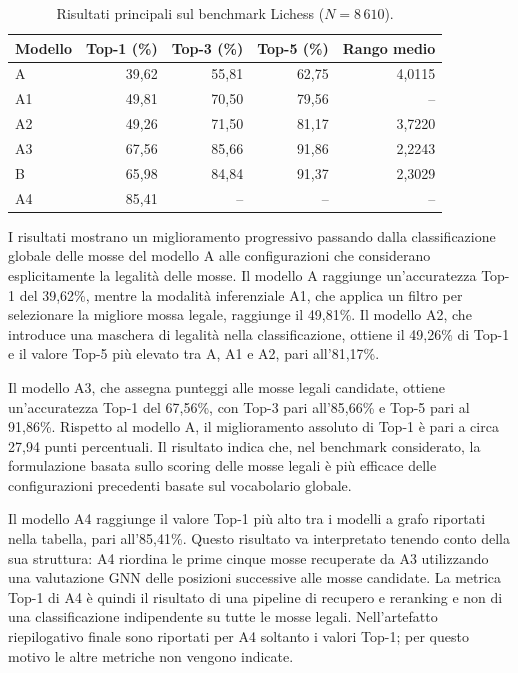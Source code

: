 \begin{table}[htbp]
    \centering
    \small
    \caption{Risultati principali sul benchmark Lichess (\(N=8\,610\)).}
    \label{tab:lichess-main-results}
    \begin{tabular}{lrrrr}
        \toprule
        Modello & Top-1 (\%) & Top-3 (\%) & Top-5 (\%) & Rango medio \\
        \midrule
        A   & 39,62 & 55,81 & 62,75 & 4,0115 \\
        A1  & 49,81 & 70,50 & 79,56 & -- \\
        A2  & 49,26 & 71,50 & 81,17 & 3,7220 \\
        A3  & 67,56 & 85,66 & 91,86 & 2,2243 \\
        B   & 65,98 & 84,84 & 91,37 & 2,3029 \\
        A4  & 85,41 & -- & -- & -- \\
        \bottomrule
    \end{tabular}
\end{table}

I risultati mostrano un miglioramento progressivo passando dalla classificazione globale delle mosse del modello A alle configurazioni che considerano esplicitamente la legalità delle mosse. Il modello A raggiunge un'accuratezza Top-1 del 39,62\%, mentre la modalità inferenziale A1, che applica un filtro per selezionare la migliore mossa legale, raggiunge il 49,81\%. Il modello A2, che introduce una maschera di legalità nella classificazione, ottiene il 49,26\% di Top-1 e il valore Top-5 più elevato tra A, A1 e A2, pari all'81,17\%.

Il modello A3, che assegna punteggi alle mosse legali candidate, ottiene un'accuratezza Top-1 del 67,56\%, con Top-3 pari all'85,66\% e Top-5 pari al 91,86\%. Rispetto al modello A, il miglioramento assoluto di Top-1 è pari a circa 27,94 punti percentuali. Il risultato indica che, nel benchmark considerato, la formulazione basata sullo scoring delle mosse legali è più efficace delle configurazioni precedenti basate sul vocabolario globale.

Il modello A4 raggiunge il valore Top-1 più alto tra i modelli a grafo riportati nella tabella, pari all'85,41\%. Questo risultato va interpretato tenendo conto della sua struttura: A4 riordina le prime cinque mosse recuperate da A3 utilizzando una valutazione GNN delle posizioni successive alle mosse candidate. La metrica Top-1 di A4 è quindi il risultato di una pipeline di recupero e reranking e non di una classificazione indipendente su tutte le mosse legali. Nell'artefatto riepilogativo finale sono riportati per A4 soltanto i valori Top-1; per questo motivo le altre metriche non vengono indicate.

